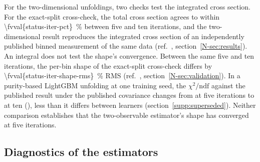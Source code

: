 For the two-dimensional unfoldings, two checks test the integrated cross section. For the exact-split cross-check, the total cross section agrees to within \SI{\fvval{status-iter-pct}}{\percent} between five and ten iterations, and the two-dimensional result reproduces the integrated cross section of an independently published binned measurement of the same data (ref.~\cite{AnalysisNote2026}, section~\ref*{N-sec:results}). An integral does not test the shape's convergence. Between the same five and ten iterations, the per-bin shape of the exact-split cross-check differs by \SI{\fvval{status-iter-shape-rms}}{\percent} RMS (ref.~\cite{AnalysisNote2026}, section~\ref*{N-sec:validation}). In a purity-based LightGBM unfolding at one training seed, the $\chi^{2}/\mathrm{ndf}$ against the published result under the published covariance changes from  at five iterations to  at ten (), less than it differs between learners (section~\ref{supp:superseded}). Neither comparison establishes that the two-observable estimator's shape has converged at five iterations.

\subsection{Diagnostics of the estimators}
\label{supp:diagnostics}

